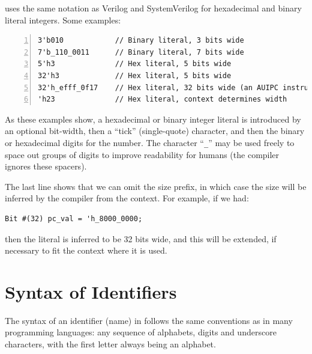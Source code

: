 {\BSV} uses the same notation as Verilog and SystemVerilog for
hexadecimal and binary literal integers.  Some examples:

{\footnotesize
\begin{Verbatim}[frame=single, numbers=left]
3'b010            // Binary literal, 3 bits wide
7'b_110_0011      // Binary literal, 7 bits wide
5'h3              // Hex literal, 5 bits wide
32'h3             // Hex literal, 5 bits wide
32'h_efff_0f17    // Hex literal, 32 bits wide (an AUIPC instruction)
'h23              // Hex literal, context determines width
\end{Verbatim}
}

As these examples show, a hexadecimal or binary integer literal is
introduced by an optional bit-width, then a ``tick'' (single-quote)
character, and then the binary or hexadecimal digits for the number.
The character ``{\verb|_|}'' may be used freely to space out groups of
digits to improve readability for humans (the compiler ignores these
spacers).

The last line shows that we can omit the size prefix, in which case
the size will be inferred by the compiler from the context. For
example, if we had:

{\footnotesize
\begin{Verbatim}[frame=single]
   Bit #(32) pc_val = 'h_8000_0000;
\end{Verbatim}
}

then the literal is inferred to be 32 bits wide, and this will be
extended, if necessary to fit the context where it is used.


\section{Syntax of Identifiers}

\label{BSV_Syntax_of_Identifiers}


The syntax of an identifier (name) in {\BSV} follows the same conventions
as in many programming languages: any sequence of alphabets, digits
and underscore characters, with the first letter always being an
alphabet.


